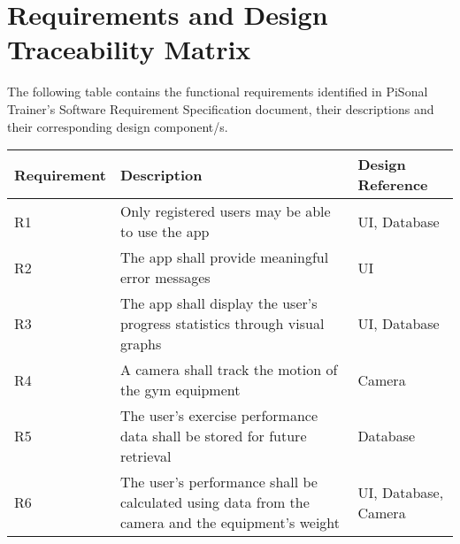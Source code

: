 \documentclass{article}
\begin{document}
\begingroup
\begin{center}
\begin{figure}[h]
\end{figure}
\end{center}
\endgroup

\newpage
\section{Requirements and Design Traceability Matrix}
The following table contains the functional requirements identified in PiSonal Trainer's Software Requirement Specification document, their descriptions and their corresponding design component/s.
\begingroup
\begin{center}
\begin{tabular}{| p{2.5cm} | p{7cm} | p{3.5cm} |}
    \hline
    \textbf{Requirement} & \textbf{Description} & \textbf{Design Reference} \\
    \hline
    R1 & Only registered users may be able to use the app & UI, Database\\
    R2 & The app shall provide meaningful error messages & UI \\
    R3 & The app shall display the user’s progress statistics through visual graphs & UI, Database \\
    R4 & A camera shall track the motion of the gym equipment & Camera\\
    R5 & The user’s exercise performance data shall be stored for future retrieval & Database \\
    R6 & The user’s performance shall be calculated using data from the camera and the equipment’s weight & UI, Database, Camera \\
    \hline
\end{tabular}
\end{center}
\endgroup



\end{document}
